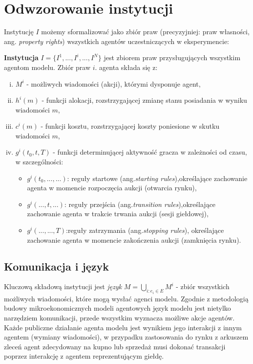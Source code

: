 \section{Odwzorowanie instytucji}
Instytucję $I$ możemy sformalizować jako zbiór praw (precyzyjniej: praw własności, ang. \textit{property rights}) wszystkich agentów uczestniczących w eksperymencie:
\begin{definition}\label{def:insitution}
\textbf{Instytucja} $I=\{I^1, ...,I^i, ...,I^N\}$ jest zbiorem praw przysługujących wszystkim agentom modelu. Zbiór praw $i.$ agenta składa się z: 
\begin{enumerate}[i.]
\item $M^i$ - możliwych wiadomości (akcji), którymi dysponuje agent, 
\item $h^i(m)$ - funkcji alokacji, rozstrzygającej zmianę stanu posiadania w wyniku wiadomości $m$, 
\item $c^i(m)$ - funkcji kosztu, rozstrzygającej koszty poniesione w skutku wiadomości $m$,
\item $g^i(t_0, t, T)$ - funkcji determinującej aktywność gracza w zależności od czasu, w szczególności: 
\begin{itemize}
\item $g^i(t_0,...,...)$: reguły startowe (ang.\textit{starting rules}),określające zachowanie agenta w momencie rozpoczęcia aukcji (otwarcia rynku),
\item $g^i(..., t, ...)$: reguły przejścia (ang.\textit{transition rules}),określające zachowanie agenta w trakcie trwania aukcji (sesji giełdowej),
\item $g^i(..., ..., T)$:reguły zatrzymania (ang.\textit{stopping rules}), określające zachowanie agenta w momencie zakończenia aukcji (zamknięcia rynku).
\end{itemize}  
\end{enumerate}
\end{definition}
\subsection{Komunikacja i język}\label{sec:language}
Kluczową składową instytucji jest \textit{język} $M=\bigcup_{i: e_i\in E} M^i$ - zbiór wszystkich możliwych wiadomości, które mogą wysłać agenci modelu. Zgodnie z metodologią budowy mikroekonomicznych modeli agentowych \cite{smith82} język modelu jest nietylko narzędziem komunikacji, przede wszystkim wyznacza możliwe akcje agentów. Każde publiczne działanie agenta modelu jest wynikiem jego interakcji z innym agentem (wymiany wiadomości), w przypadku zastosowania do rynku z arkuszem zleceń agent zdecydowany na kupno lub sprzedaż musi dokonać transakcji poprzez interakcję z agentem reprezentującym giełdę. 

